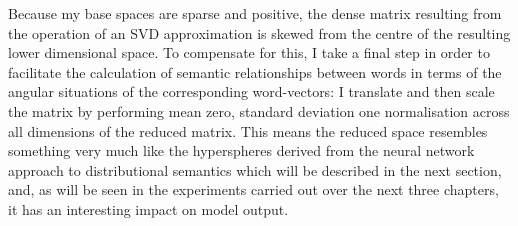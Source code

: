 Because my base spaces are sparse and positive, the dense matrix resulting from the operation of an SVD approximation is skewed from the centre of the resulting lower dimensional space.  To compensate for this, I take a final step in order to facilitate the calculation of semantic relationships between words in terms of the angular situations of the corresponding word-vectors: I translate and then scale the matrix by performing mean zero, standard deviation one normalisation across all dimensions of the reduced matrix.  This means the reduced space resembles something very much like the hyperspheres derived from the neural network approach to distributional semantics which will be described in the next section, and, as will be seen in the experiments carried out over the next three chapters, it has an interesting impact on model output.



